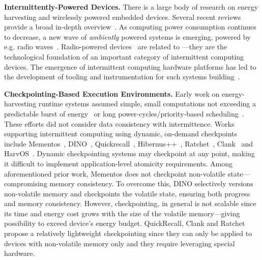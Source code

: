 \textbf{Intermittently-Powered Devices.} There is a large body of research on energy harvesting and wirelessly powered embedded devices. Several recent reviews provide a broad in-depth overview~\cite{prasad_comst_2014,sample_procieee_2013,huang:commag:2015,visser_procieee_2013,kamalinejad_commag_2015,ku_cst_2016}. As computing power consumption continues to decrease, a new wave of {\em ambiently} powered systems is emerging, powered by e.g. radio waves~\cite{patel_pervasive_2017,rf_powered_computing_gollakota_2014}.
Radio-powered devices~\cite{wisp5,moo,zhao_rfid_2015,holleman_biocas_2008,thomas_jbcs_2012,naderiparizi_rfid_2015,rodriguez_tbcs_2015,liu_sigcomm_2013,kicksat,nadeau_naturebio_2017}
are related to \sys---they are the technological foundation of an
important category of intermittent computing devices. The emergence of
intermittent computing hardware platforms has led to the development of tooling
and instrumentation for such systems building~\cite{hester_sensys_2014,hester_sensys_2015,edb,stork,wisent}.

\textbf{Checkpointing-Based Execution Environments.} Early work on energy-harvesting runtime systems assumed simple, small computations not exceeding a predictable burst of energy~\cite{dewdrop} or long power-cycles/priority-based scheduling~\cite{sorber_sensys_2007}. These efforts did not consider data consistency with intermittence. Works supporting intermittent computing using dynamic, on-demand checkpoints include Mementos~\cite{mementos}, DINO~\cite{dino}, Quickrecall~\cite{quickrecall}, Hibernus++~\cite{hibernusplusplus}, Ratchet~\cite{ratchet}, Clank~\cite{hicks_isca_2017} and HarvOS~\cite{mottola2017harvos}. Dynamic checkpointing systems may checkpoint at any point, making it difficult to implement application-level atomicity requirements. Among aforementioned prior work, Mementos does not checkpoint non-volatile state---compromising memory consistency. To overcome this, DINO selectively versions non-volatile memory and checkpoints the volatile state, ensuring both progress and memory consistency. However, checkpointing, in general is not scalable since its time and energy cost grows with the size of the volatile memory---giving possibility to exceed device's energy budget. QuickRecall, Clank and Ratchet propose a relatively lightweight checkpointing since they can only be
applied to devices with  non-volatile memory only and they require leveraging special hardware.  



